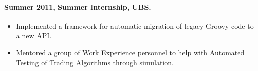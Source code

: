 \documentclass[11pt, a4paper]{article}
\newlength{\wideitemsep}
\let\olditem\item
\renewcommand{\item}{\setlength{\itemsep}{\wideitemsep}\olditem}
\begin{document}

\paragraph{Summer 2011, Summer Internship, UBS.}
\begin{itemize}
\item Implemented a framework for automatic migration of legacy Groovy code to a new API.
\item Mentored a group of Work Experience personnel to help with Automated Testing of Trading Algorithms through simulation.
\end{itemize}


\end{document}
